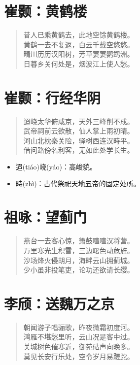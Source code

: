 \documentclass[12pt,oneside]{book}
\newenvironment{shici}{
\begin{verse}
\centering\large\hspace{12pt}}
{\end{verse}}
\begin{document}
\chapter{崔颢：黄鹤楼}
\begin{shici}
昔人已乘黄鹤去，此地空馀黄鹤楼。\\
黄鹤一去不复返，白云千载空悠悠。\\
晴川历历汉阳树，芳草萋萋鹦鹉洲。\\
日暮乡关何处是，烟波江上使人愁。
\end{shici}

\chapter{崔颢：行经华阴}
\begin{shici}
迢峣太华俯咸京，天外三峰削不成。\\
武帝祠前云欲散，仙人掌上雨初晴。\\
河山北枕秦关险，驿树西连汉畤平。\\
借问路傍名利客，无如此处学长生。
\end{shici}

\begin{itemize}
\item 迢(tiáo)峣(yáo)：高峻貌。
\item 畤(zhì)：古代祭祀天地五帝的固定处所。
\end{itemize}

\chapter{祖咏：望蓟门}
\begin{shici}
燕台一去客心惊，箫鼓喧喧汉将营。\\
万里寒光生积雪，三边曙色动危旌。\\
沙场烽火侵胡月，海畔云山拥蓟城。\\
少小虽非投笔吏，论功还欲请长缨。
\end{shici}

\chapter{李颀：送魏万之京}
\begin{shici}
朝闻游子唱骊歌，昨夜微霜初度河。\\
鸿雁不堪愁里听，云山况是客中过。\\
关城树色催寒近，御苑砧声向晚多。\\
莫见长安行乐处，空令岁月易蹉跎。
\end{shici}
\end{document}
